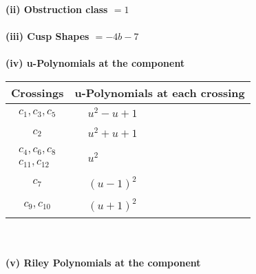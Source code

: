 \documentclass[1p]{elsarticle_modified}
\theoremstyle{definition}
\begin{document}
\flushleft \textbf{(ii) Obstruction class $= 1$}\\~\\
\flushleft \textbf{(iii) Cusp Shapes $= -4 b-7$}\\~\\
\newpage\renewcommand{\arraystretch}{1}
\flushleft \textbf{(iv) u-Polynomials at the component}\newline \\
\begin{tabular}{m{50pt}|m{274pt}}
Crossings & \hspace{64pt}u-Polynomials at each crossing \\
\hline $$\begin{aligned}c_{1},c_{3},c_{5}\end{aligned}$$&$\begin{aligned}
&u^2- u+1
\end{aligned}$\\
\hline $$\begin{aligned}c_{2}\end{aligned}$$&$\begin{aligned}
&u^2+u+1
\end{aligned}$\\
\hline $$\begin{aligned}c_{4},c_{6},c_{8}\\c_{11},c_{12}\end{aligned}$$&$\begin{aligned}
&u^2
\end{aligned}$\\
\hline $$\begin{aligned}c_{7}\end{aligned}$$&$\begin{aligned}
&(u-1)^2
\end{aligned}$\\
\hline $$\begin{aligned}c_{9},c_{10}\end{aligned}$$&$\begin{aligned}
&(u+1)^2
\end{aligned}$\\
\hline
\end{tabular}\\~\\
\newpage\renewcommand{\arraystretch}{1}
\flushleft \textbf{(v) Riley Polynomials at the component}\newline \\
\end{document}
